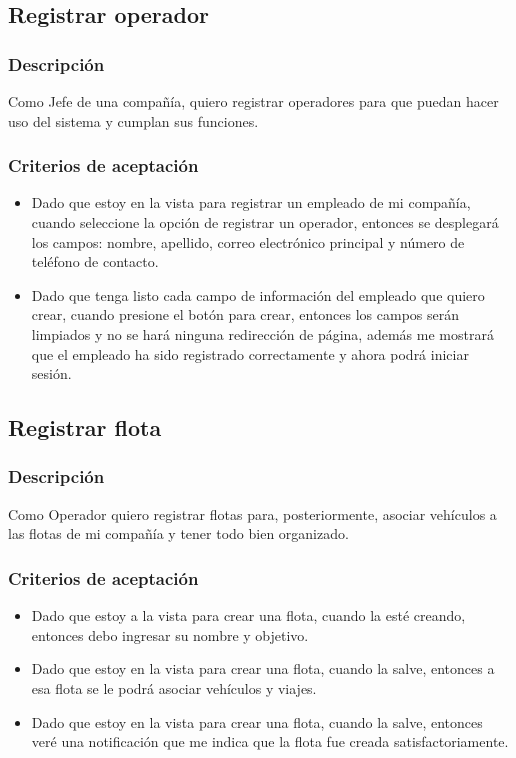 \documentclass{article}
\begin{document}
\subsection{Registrar operador}
\subsubsection{Descripción}
Como Jefe de una compañía, quiero registrar operadores para que puedan hacer uso del sistema y cumplan sus funciones.
\subsubsection{Criterios de aceptación}
\begin{itemize}
    \item Dado que estoy en la vista para registrar un empleado de mi compañía, cuando seleccione la opción de registrar un operador, entonces se desplegará los campos: nombre, apellido, correo electrónico principal y número de teléfono de contacto.
    \item Dado que tenga listo cada campo de información del empleado que quiero crear, cuando presione el botón para crear, entonces los campos serán limpiados y no se hará ninguna redirección de página, además me mostrará que el empleado ha sido registrado correctamente y ahora podrá iniciar sesión.
\end{itemize}

\subsection{Registrar flota}
\subsubsection{Descripción}
Como Operador quiero registrar flotas para, posteriormente, asociar vehículos a las flotas de mi compañía y tener todo bien organizado.
\subsubsection{Criterios de aceptación}
\begin{itemize}
    \item Dado que estoy a la vista para crear una flota, cuando la esté creando, entonces debo ingresar su nombre y objetivo.
    \item Dado que estoy en la vista para crear una flota, cuando la salve, entonces a esa flota se le podrá asociar vehículos y viajes.
    \item Dado que estoy en la vista para crear una flota, cuando la salve, entonces veré una notificación que me indica que la flota fue creada satisfactoriamente.
\end{itemize}
\end{document}
